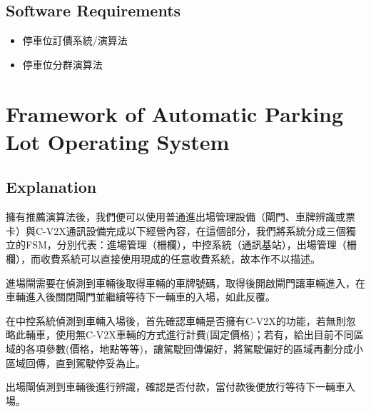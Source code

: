 \documentclass[sigconf,authorversion,nonacm,screen]{acmart}
\begin{document}
\subsection{Software Requirements}

\begin{itemize}
    \item 停車位訂價系統/演算法
    \item 停車位分群演算法
\end{itemize}

\section{Framework of Automatic Parking Lot Operating System}

\subsection{Explanation}
\quad 擁有推薦演算法後，我們便可以使用普通進出場管理設備（閘門、車牌辨識或票卡）與C-V2X通訊設備完成以下經營內容，在這個部分，我們將系統分成三個獨立的FSM，分別代表：進場管理（柵欄），中控系統（通訊基站），出場管理（柵欄），而收費系統可以直接使用現成的任意收費系統，故本作不以描述。

進場閘需要在偵測到車輛後取得車輛的車牌號碼，取得後開啟閘門讓車輛進入，在車輛進入後關閉閘門並繼續等待下一輛車的入場，如此反覆。

在中控系統偵測到車輛入場後，首先確認車輛是否擁有C-V2X的功能，若無則忽略此輛車，使用無C-V2X車輛的方式進行計費(固定價格)；若有，給出目前不同區域的各項參數(價格，地點等等)，讓駕駛回傳偏好，將駕駛偏好的區域再劃分成小區域回傳，直到駕駛停妥為止。

出場閘偵測到車輛後進行辨識，確認是否付款，當付款後便放行等待下一輛車入場。
\end{document}
